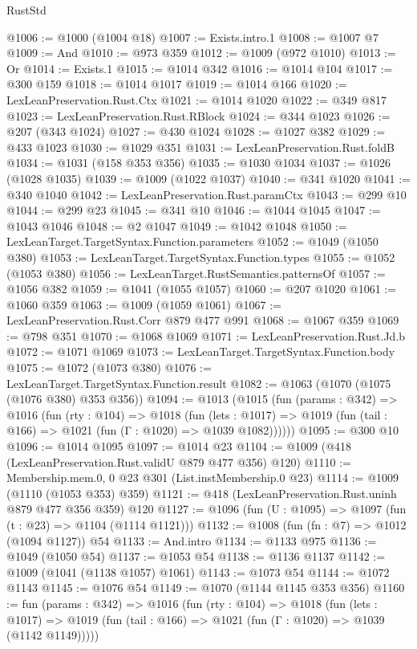 \begin{lexlean}{RustStd}
\begin{coremodule}
@1006 := @1000 (@1004 @18)
@1007 := Exists.intro.{1}
@1008 := @1007 @7
@1009 := And
@1010 := @973 @359
@1012 := @1009 (@972 @1010)
@1013 := Or
@1014 := Exists.{1}
@1015 := @1014 @342
@1016 := @1014 @104
@1017 := @300 @159
@1018 := @1014 @1017
@1019 := @1014 @166
@1020 := LexLeanPreservation.Rust.Ctx
@1021 := @1014 @1020
@1022 := @349 @817
@1023 := LexLeanPreservation.Rust.RBlock
@1024 := @344 @1023
@1026 := @207 (@343 @1024)
@1027 := @430 @1024
@1028 := @1027 @382
@1029 := @433 @1023
@1030 := @1029 @351
@1031 := LexLeanPreservation.Rust.foldB
@1034 := @1031 (@158 @353 @356)
@1035 := @1030 @1034
@1037 := @1026 (@1028 @1035)
@1039 := @1009 (@1022 @1037)
@1040 := @341 @1020
@1041 := @340 @1040
@1042 := LexLeanPreservation.Rust.paramCtx
@1043 := @299 @10
@1044 := @299 @23
@1045 := @341 @10
@1046 := @1044 @1045
@1047 := @1043 @1046
@1048 := @2 @1047
@1049 := @1042 @1048
@1050 := LexLeanTarget.TargetSyntax.Function.parameters
@1052 := @1049 (@1050 @380)
@1053 := LexLeanTarget.TargetSyntax.Function.types
@1055 := @1052 (@1053 @380)
@1056 := LexLeanTarget.RustSemantics.patternsOf
@1057 := @1056 @382
@1059 := @1041 (@1055 @1057)
@1060 := @207 @1020
@1061 := @1060 @359
@1063 := @1009 (@1059 @1061)
@1067 := LexLeanPreservation.Rust.Corr @879 @477 @991
@1068 := @1067 @359
@1069 := @798 @351
@1070 := @1068 @1069
@1071 := LexLeanPreservation.Rust.Jd.b
@1072 := @1071 @1069
@1073 := LexLeanTarget.TargetSyntax.Function.body
@1075 := @1072 (@1073 @380)
@1076 := LexLeanTarget.TargetSyntax.Function.result
@1082 := @1063 (@1070 (@1075 (@1076 @380) @353 @356))
@1094 := @1013
    (@1015
      (fun (params : @342) =>
      @1016
        (fun (rty : @104) =>
        @1018
          (fun (lets : @1017) =>
          @1019 (fun (tail : @166) => @1021 (fun (Γ : @1020) => @1039 @1082))))))
@1095 := @300 @10
@1096 := @1014 @1095
@1097 := @1014 @23
@1104 := @1009 (@418 (LexLeanPreservation.Rust.validU @879 @477 @356) @120)
@1110 := Membership.mem.{0, 0} @23 @301 (List.instMembership.{0} @23)
@1114 := @1009 (@1110 (@1053 @353) @359)
@1121 := @418 (LexLeanPreservation.Rust.uninh @879 @477 @356 @359) @120
@1127 := @1096 (fun (U : @1095) => @1097 (fun (t : @23) => @1104 (@1114 @1121)))
@1132 := @1008 (fun (fn : @7) => @1012 (@1094 @1127)) @54
@1133 := And.intro
@1134 := @1133 @975
@1136 := @1049 (@1050 @54)
@1137 := @1053 @54
@1138 := @1136 @1137
@1142 := @1009 (@1041 (@1138 @1057) @1061)
@1143 := @1073 @54
@1144 := @1072 @1143
@1145 := @1076 @54
@1149 := @1070 (@1144 @1145 @353 @356)
@1160 := fun (params : @342) =>
  @1016
    (fun (rty : @104) =>
    @1018
      (fun (lets : @1017) =>
      @1019 (fun (tail : @166) => @1021 (fun (Γ : @1020) => @1039 (@1142 @1149)))))

\end{coremodule}
\end{lexlean}
